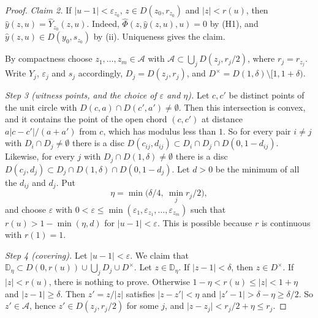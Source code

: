 \documentclass[11pt]{amsart}
\theoremstyle{definition}
\theoremstyle{remark}
\numberwithin{equation}{section}
\newcommand{\DD}{\mathbb{D}}
\newcommand{\cA}{\mathcal{A}}
\newcommand{\abs}[1]{\lvert #1\rvert}
\begin{document}
\begin{proof}
\emph{Claim 2.} If \(\abs{u-1}<\varepsilon_{z_0}\), \(z\in D(z_0,r_{z_0})\) and \(\abs{z}<r(u)\), then \(\hat y(z,u)=\hat Y_{z_0}(z,u)\). Indeed, \(\hat\Phi(z,\hat y(z,u),u)=0\) by (H1), and \(\hat y(z,u)\in D(y_0,s_{z_0})\) by (ii). Uniqueness gives the claim.

By compactness choose \(z_1,\dots,z_m\in\cA\) with \(\cA\subset\bigcup_jD(z_j,r_j/2)\), where \(r_j=r_{z_j}\). Write \(\hat Y_j\), \(\varepsilon_j\) and \(s_j\) accordingly, \(D_j=D(z_j,r_j)\), and \(D^{\times}=D(1,\delta)\setminus[1,1+\delta)\).

\emph{Step 3 (witness points, and the choice of \(\varepsilon\) and \(\eta\)).} Let \(c,c'\) be distinct points of the unit circle with \(D(c,a)\cap D(c',a')\ne\emptyset\). Then this intersection is convex, and it contains the point of the open chord \((c,c')\) at distance \(a\abs{c-c'}/(a+a')\) from \(c\), which has modulus less than \(1\). So for every pair \(i\ne j\) with \(D_i\cap D_j\ne\emptyset\) there is a disc \(D(c_{ij},d_{ij})\subset D_i\cap D_j\cap D(0,1-d_{ij})\). Likewise, for every \(j\) with \(D_j\cap D(1,\delta)\ne\emptyset\) there is a disc \(D(c_j,d_j)\subset D_j\cap D(1,\delta)\cap D(0,1-d_j)\). Let \(d>0\) be the minimum of all the \(d_{ij}\) and \(d_j\). Put
\[
\eta=\min\bigl(\delta/4,\ \min_jr_j/2\bigr),
\]
and choose \(\varepsilon\) with \(0<\varepsilon\le\min(\varepsilon_1,\varepsilon_{z_1},\dots,\varepsilon_{z_m})\) such that \(r(u)>1-\min(\eta,d)\) for \(\abs{u-1}<\varepsilon\). This is possible because \(r\) is continuous with \(r(1)=1\).

\emph{Step 4 (covering).} Let \(\abs{u-1}<\varepsilon\). We claim that \(\DD_\eta\subset D(0,r(u))\cup\bigcup_jD_j\cup D^{\times}\). Let \(z\in\DD_\eta\). If \(\abs{z-1}<\delta\), then \(z\in D^{\times}\). If \(\abs{z}<r(u)\), there is nothing to prove. Otherwise \(1-\eta<r(u)\le\abs{z}<1+\eta\) and \(\abs{z-1}\ge\delta\). Then \(z'=z/\abs{z}\) satisfies \(\abs{z-z'}<\eta\) and \(\abs{z'-1}>\delta-\eta\ge\delta/2\). So \(z'\in\cA\), hence \(z'\in D(z_j,r_j/2)\) for some \(j\), and \(\abs{z-z_j}<r_j/2+\eta\le r_j\).


\end{proof}
\end{document}
